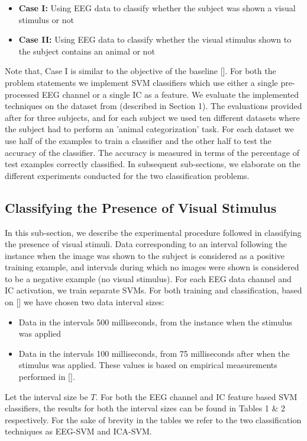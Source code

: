 \documentclass{article} %
\begin{document}
\begin{itemize}
	\item \textbf{Case I:} Using EEG data to classify whether the subject was shown a visual stimulus or not 
	\item \textbf{Case II:} Using EEG data to classify whether the visual stimulus shown to the subject contains an animal or not 
\end{itemize}

Note that, Case I is similar to the objective of the baseline []. For both the problem statements we implement SVM classifiers which use either a single pre-processed EEG channel or a single IC as a feature. We evaluate the implemented techniques on the dataset from \cite{data} (described in Section 1). The evaluations provided after for three subjects, and for each subject we used ten different datasets where the subject had to perform an 'animal categorization' task. For each dataset we use half of the examples to train a classifier and the other half to test the accuracy of the classifier. The accuracy is measured in terms of the percentage of test examples correctly classified. In subsequent sub-sections, we elaborate on the different experiments conducted for the two classification problems.

\subsection{Classifying the Presence of Visual Stimulus}
In this sub-section, we describe the experimental procedure followed in classifying the presence of visual stimuli. Data corresponding to an interval following the instance when the image was shown to the subject is considered as a positive training example, and intervals during which no images were shown is considered to be a negative example (no visual stimulus). For each EEG data channel and IC activation, we train separate SVMs. For both training and classification, based on [] we have chosen two data interval sizes:

\begin{itemize}
	\item Data in the intervals 500 milliseconds, from the instance when the stimulus was applied
	\item Data in the intervals 100 milliseconds, from 75 milliseconds after when the stimulus was applied. These values is based on empirical measurements performed in [].
\end{itemize}
Let the interval size be $T$. For both the EEG channel and IC feature based SVM classifiers, the results for both the interval sizes can be found in Tables 1 \& 2 respectively. For the sake of brevity in the tables we refer to the two classification techniques as EEG-SVM and ICA-SVM. 
\end{document}
